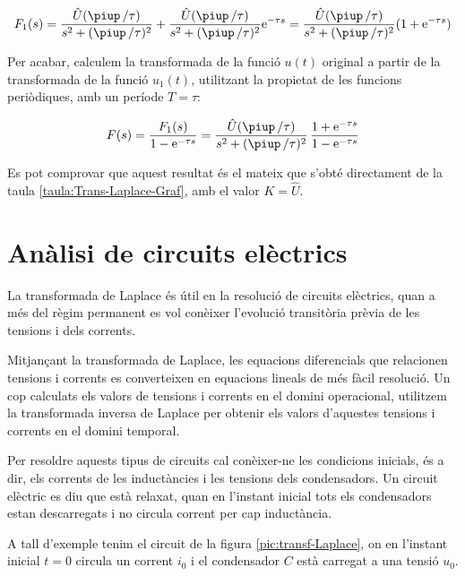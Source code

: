 \begin{exemple}[\CalcTransfLaplace{}]
    \[
        F_1(s) = \frac{\hat{U} (\piup\,/\tau)}{s^2 + (\piup\,/\tau)^2} +
        \frac{\hat{U} (\piup\,/\tau)}{s^2 + (\piup\,/\tau)^2} \eu^{-\tau s} =
        \frac{\hat{U} (\piup\,/\tau)}{s^2 + (\piup\,/\tau)^2} (1+\eu^{-\tau s})
    \]

    Per acabar, calculem la transformada de la funció $u(t)$ original a
    partir de la transformada de la funció $u_1(t)$, utilitzant la
    propietat de les funcions periòdiques, amb un període $T=\tau$:

    \[
        F(s) = \frac{F_1(s)}{1-\eu^{-\tau s}} =
        \frac{\hat{U} (\piup\,/\tau) }{s^2 + (\piup\,/\tau)^2}\,\frac{1+\eu^{-\tau s}}{1-\eu^{-\tau
        s}}
    \]

    Es pot comprovar que aquest resultat és el mateix que s'obté directament de la taula \vref{taula:Trans-Laplace-Graf}, amb el valor $K=\hat{U}$.
\end{exemple}

\section{Anàlisi de circuits elèctrics}

La transformada de Laplace és útil en la resolució de circuits
elèctrics, quan a més del règim permanent es vol conèixer
l'evolució transitòria prèvia de les tensions i dels corrents.

Mitjançant la transformada de Laplace, les equacions diferencials
que relacionen tensions i corrents es converteixen en equacions
lineals de més fàcil resolució. Un cop calculats els valors de
tensions i corrents en el domini operacional, utilitzem la
transformada inversa de Laplace per obtenir els valors d'aquestes
tensions i corrents en el domini temporal.

Per  resoldre aquests tipus de circuits cal conèixer-ne les
condicions inicials, és a dir, els corrents de les inductàncies i
les tensions dels condensadors. Un circuit elèctric es diu que està
relaxat, quan en l'instant inicial tots els condensadors estan
descarregats i no circula corrent per cap inductància.

A tall d'exemple tenim el circuit de la figura
\vref{pic:transf-Laplace}, on en l'instant inicial $t=0$ circula un
corrent $i_0$ i el condensador $C$ està carregat a una tensió $u_0$.

\begin{center}
    
    \label{pic:transf-Laplace}
\end{center}


